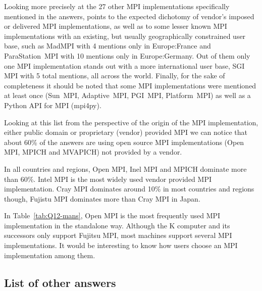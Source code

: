 Looking more precisely at the 27 other MPI implementations specifically
mentioned in the answers, points to the expected dichotomy of vendor's imposed
or delivered MPI implementations, as well as to some lesser known MPI
implementations with an existing, but usually geographically constrained user
base, such as MadMPI with 4 mentions only in Europe:France and ParaStation~MPI
with 10 mentions only in Europe:Germany. Out of them only one MPI implementation
stands out with a more international user base, SGI MPI with 5 total mentions,
all across the world. Finally, for the sake of completeness it should be noted
that some MPI implementations were mentioned at least once (Sun~MPI,
Adaptive~MPI, PGI~MPI, Platform~MPI) as well as a Python API for MPI (mpi4py).



Looking at this list from the perspective of the origin of the MPI
implementation, either public domain or proprietary (vendor) provided MPI we can
notice that about 60\% of the answers are using open source MPI
implementations (Open MPI, MPICH and MVAPICH)  not provided by a
vendor. 

In all countries and regions, Open MPI, Inel MPI and MPICH dominate
more than 60\%. Intel MPI is the most widely used vendor provided MPI
implementation. Cray MPI dominates around 10\% in most countries and
regions though, Fujistu MPI dominates more than Cray MPI in Japan.

In Table~\ref{tab:Q12-mans}, Open MPI is the most frequently used MPI
implementation in the standalone way.  Although the K computer and its
successors only support Fujitsu MPI, most machines support several
MPI implementations. It would be interesting to know how users choose
an MPI implementation among them.



\subsection{List of other answers}

\begin{report}
\begin{itemize}

\end{itemize}
\end{report}
